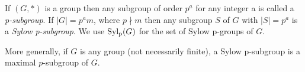 \documentclass[12pt]{article}
\begin{document}
If $(G,*)$ is a group then any subgroup of order $p^a$ for any integer a is called a \emph{p-subgroup}.  If $|G|=p^am$, where $p\nmid m$ then any subgroup $S$ of $G$ with $|S|=p^a$ is a \emph{Sylow p-subgroup}.  We use ${\rm Syl_p}(G)$ for the set of Sylow p-groups of $G$.

More generally, if $G$ is any group (not necessarily finite), a Sylow p-subgroup is a maximal $p$-subgroup of $G$.
\end{document}
